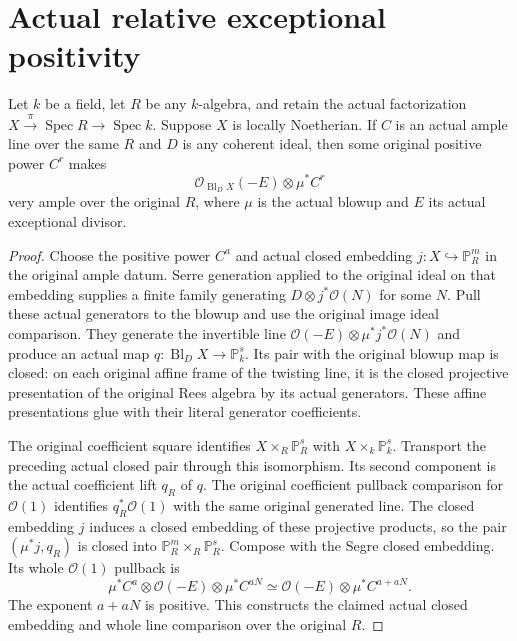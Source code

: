 \section{Actual relative exceptional positivity}
\label{sec:kn-relative-nadel-exceptional-ample}

\begin{theorem}
\label{thm:kn-relative-nadel-exceptional-very-ample}
\leanok
{}
Let $k$ be a field, let $R$ be any $k$-algebra, and retain the actual
factorization $X\xrightarrow\pi\operatorname{Spec}R\to\operatorname{Spec}k$.
Suppose $X$ is locally Noetherian.  If $C$ is an actual ample line over
the same $R$ and $D$ is any coherent ideal, then some original positive
power $C^r$ makes
\[
 \mathcal O_{\operatorname{Bl}_D X}(-E)\otimes\mu^*C^r
\]
very ample over the original $R$, where $\mu$ is the actual blowup and
$E$ its actual exceptional divisor.
\end{theorem}
\begin{proof}
Choose the positive power $C^a$ and actual closed embedding
$j:X\hookrightarrow\mathbb P^m_R$ in the original ample datum.  Serre
generation applied to the original ideal on that embedding supplies a
finite family generating $D\otimes j^*\mathcal O(N)$ for some $N$.
Pull these actual generators to the blowup and use the original image
ideal comparison.  They generate the invertible line
$\mathcal O(-E)\otimes\mu^*j^*\mathcal O(N)$ and produce an actual
map $q:\operatorname{Bl}_D X\to\mathbb P^s_k$.  Its pair with the
original blowup map is closed: on each original affine frame of the
twisting line, it is the closed projective presentation of the original
Rees algebra by its actual generators.  These affine presentations glue
with their literal generator coefficients.

The original coefficient square identifies
$X\times_R\mathbb P^s_R$ with $X\times_k\mathbb P^s_k$.
Transport the preceding actual closed pair through this isomorphism.
Its second component is the actual coefficient lift $q_R$ of $q$.
The original coefficient pullback comparison for $\mathcal O(1)$
identifies $q_R^*\mathcal O(1)$ with the same original generated line.
The closed embedding $j$ induces a closed embedding of these projective
products, so the pair $(\mu^*j,q_R)$ is closed into
$\mathbb P^m_R\times_R\mathbb P^s_R$.  Compose with the Segre closed
embedding.  Its whole $\mathcal O(1)$ pullback is
\[
 \mu^*C^a\otimes\mathcal O(-E)\otimes\mu^*C^{aN}
 \simeq\mathcal O(-E)\otimes\mu^*C^{a+aN}.
\]
The exponent $a+aN$ is positive.  This constructs the claimed actual
closed embedding and whole line comparison over the original $R$.
\end{proof}

